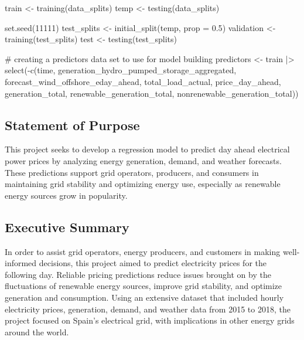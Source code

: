 \documentclass[
]{article}
\newenvironment{Shaded}{\begin{snugshade}}{\end{snugshade}}
\newcommand{\AttributeTok}[1]{\textcolor[rgb]{0.40,0.45,0.13}{#1}}
\newcommand{\CommentTok}[1]{\textcolor[rgb]{0.37,0.37,0.37}{#1}}
\newcommand{\DecValTok}[1]{\textcolor[rgb]{0.68,0.00,0.00}{#1}}
\newcommand{\FloatTok}[1]{\textcolor[rgb]{0.68,0.00,0.00}{#1}}
\newcommand{\FunctionTok}[1]{\textcolor[rgb]{0.28,0.35,0.67}{#1}}
\newcommand{\NormalTok}[1]{\textcolor[rgb]{0.00,0.23,0.31}{#1}}
\newcommand{\OtherTok}[1]{\textcolor[rgb]{0.00,0.23,0.31}{#1}}
\newcommand{\SpecialCharTok}[1]{\textcolor[rgb]{0.37,0.37,0.37}{#1}}
\begin{document}
\begin{Shaded}
\begin{Highlighting}[]
\NormalTok{train }\OtherTok{\textless{}{-}} \FunctionTok{training}\NormalTok{(data\_splits)}
\NormalTok{temp }\OtherTok{\textless{}{-}} \FunctionTok{testing}\NormalTok{(data\_splits)}

\FunctionTok{set.seed}\NormalTok{(}\DecValTok{11111}\NormalTok{)}
\NormalTok{test\_splits }\OtherTok{\textless{}{-}} \FunctionTok{initial\_split}\NormalTok{(temp, }\AttributeTok{prop =} \FloatTok{0.5}\NormalTok{)}
\NormalTok{validation }\OtherTok{\textless{}{-}} \FunctionTok{training}\NormalTok{(test\_splits)}
\NormalTok{test }\OtherTok{\textless{}{-}} \FunctionTok{testing}\NormalTok{(test\_splits)}
\end{Highlighting}
\end{Shaded}

\begin{Shaded}
\begin{Highlighting}[]
\CommentTok{\# creating a predictors data set to use for model building}
\NormalTok{predictors }\OtherTok{\textless{}{-}}\NormalTok{ train }\SpecialCharTok{|\textgreater{}}
  \FunctionTok{select}\NormalTok{(}\SpecialCharTok{{-}}\FunctionTok{c}\NormalTok{(time, generation\_hydro\_pumped\_storage\_aggregated, forecast\_wind\_offshore\_eday\_ahead, total\_load\_actual, price\_day\_ahead, generation\_total, renewable\_generation\_total, nonrenewable\_generation\_total))}
\end{Highlighting}
\end{Shaded}

\subsection{Statement of Purpose}\label{statement-of-purpose}

This project seeks to develop a regression model to predict day ahead
electrical power prices by analyzing energy generation, demand, and
weather forecasts. These predictions support grid operators, producers,
and consumers in maintaining grid stability and optimizing energy use,
especially as renewable energy sources grow in popularity.

\subsection{Executive Summary}\label{executive-summary}

In order to assist grid operators, energy producers, and customers in
making well-informed decisions, this project aimed to predict
electricity prices for the following day. Reliable pricing predictions
reduce issues brought on by the fluctuations of renewable energy
sources, improve grid stability, and optimize generation and
consumption. Using an extensive dataset that included hourly electricity
prices, generation, demand, and weather data from 2015 to 2018, the
project focused on Spain's electrical grid, with implications in other
energy grids around the world.
\end{document}
